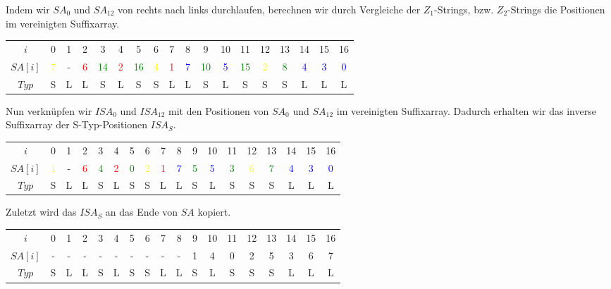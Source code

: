 Indem wir $SA_0$ und $SA_{12}$ von rechts nach links durchlaufen, berechnen wir durch Vergleiche der $Z_1$-Strings, bzw. $Z_2$-Strings die Positionen im vereinigten Suffixarray. 

\begin{table}[H]
	\centering
	\begin{tabular}{c| c c c c c c c c c c c c c c c c c}
		$i$ & 0 & 1 & 2 & 3 & 4 & 5 & 6 & 7 & 8 & 9 & 10 & 11 & 12 & 13 & 14 & 15 & 16 \\
		$SA[i]$ & \textcolor{yellow}{7} & - & \textcolor{red}{6} & \textcolor{green}{14} & \textcolor{red}{2} & \textcolor{green}{16} & \textcolor{yellow}{4} & \textcolor{red}{1} & \textcolor{blue}{7} & \textcolor{green}{10} & \textcolor{blue}{5} & \textcolor{green}{15} & \textcolor{yellow}{2} & \textcolor{green}{8} & \textcolor{blue}{4} & \textcolor{blue}{3} & \textcolor{blue}{0} \\
		$Typ$ & S & L & L & S & L & S & S & L & L & S & L & S & S & S & L & L & L
	\end{tabular}
\end{table}

Nun verknüpfen wir $ISA_0$ und $ISA_{12}$ mit den Positionen von $SA_0$ und $SA_{12}$ im vereinigten Suffixarray. Dadurch erhalten wir das inverse Suffixarray der S-Typ-Positionen $ISA_S$.

\begin{table}[H]
	\centering
	\begin{tabular}{c| c c c c c c c c c c c c c c c c c}
		$i$ & 0 & 1 & 2 & 3 & 4 & 5 & 6 & 7 & 8 & 9 & 10 & 11 & 12 & 13 & 14 & 15 & 16 \\
		$SA[i]$ & \textcolor{yellow}{1} & - & \textcolor{red}{6} & \textcolor{green}{4} & \textcolor{red}{2} & \textcolor{green}{0} & \textcolor{yellow}{2} & \textcolor{red}{1} & \textcolor{blue}{7} & \textcolor{green}{5} & \textcolor{blue}{5} & \textcolor{green}{3} & \textcolor{yellow}{6} & \textcolor{green}{7} & \textcolor{blue}{4} & \textcolor{blue}{3} & \textcolor{blue}{0} \\
		$Typ$ & S & L & L & S & L & S & S & L & L & S & L & S & S & S & L & L & L
	\end{tabular}
\end{table}

Zuletzt wird das $ISA_S$ an das Ende von $SA$ kopiert. 

\begin{table}[H]
	\centering
	\begin{tabular}{c| c c c c c c c c c c c c c c c c c}
		$i$ & 0 & 1 & 2 & 3 & 4 & 5 & 6 & 7 & 8 & 9 & 10 & 11 & 12 & 13 & 14 & 15 & 16 \\
		$SA[i]$ & - & - & - & - & - & - & - & - & - & 1 & 4 & 0 & 2 & 5 & 3 & 6 & 7 \\
		$Typ$ & S & L & L & S & L & S & S & L & L & S & L & S & S & S & L & L & L
	\end{tabular}
\end{table}

